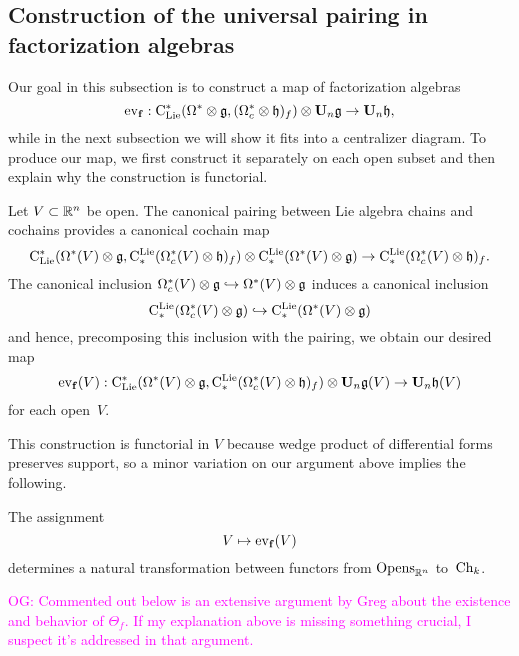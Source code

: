\documentclass[11pt]{amsart}
\numberwithin{equation}{section}
\def\owen{\textcolor{magenta}{OG: }\textcolor{magenta}}
\begin{document}
\subsection{Construction of the universal pairing in factorization algebras}
\label{SS:constuctionthetaf}

Our goal in this subsection is to construct a map of factorization algebras
\[
{\rm ev}_{\bf{f}}: {\rm C}_{\rm Lie}^*(\Omega^* \otimes \mathfrak g, (\Omega^*_c \otimes \mathfrak h)_f) \otimes \mathbf U_n \mathfrak g \to \mathbf U_n \mathfrak h,
\]
while in the next subsection we will show it fits into a centralizer diagram.
To produce our map, we first construct it separately on each open subset and then explain why the construction is functorial. 

Let $V \subset \mathbb R^n$ be open.
The canonical pairing between Lie algebra chains and cochains provides a canonical cochain map
\[
{\rm C}_{\rm Lie}^*(\Omega^*(V) \otimes \mathfrak g, {\rm C}^{\rm Lie}_*(\Omega^*_c(V) \otimes \mathfrak h)_f) \otimes {\rm C}^{\rm Lie}_*(\Omega^*(V) \otimes \mathfrak g) \to {\rm C}^{\rm Lie}_*(\Omega^*_c(V) \otimes \mathfrak h)_f.
\]
The canonical inclusion $\Omega^*_c(V) \otimes \mathfrak g \hookrightarrow \Omega^*(V) \otimes \mathfrak g$ induces a canonical inclusion 
\[
{\rm C}^{\rm Lie}_*(\Omega^*_c(V) \otimes \mathfrak g) \hookrightarrow {\rm C}^{\rm Lie}_*(\Omega^*(V) \otimes \mathfrak g)
\]
and hence, precomposing this inclusion with the pairing, we obtain our desired map
\[
{\rm ev}_{\bf{f}}(V): {\rm C}_{\rm Lie}^*(\Omega^*(V) \otimes \mathfrak g, {\rm C}^{\rm Lie}_*(\Omega^*_c(V) \otimes \mathfrak h)_f) \otimes \mathbf U_n \mathfrak g(V) \to \mathbf U_n \mathfrak h(V)
\]
for each open~$V$.

This construction is functorial in $V$ because wedge product of differential forms preserves support,
so a minor variation on our argument above implies the following.

\begin{lmm}
The assignment
\[
V \mapsto {\rm ev}_{\bf{f}}(V)
\]
determines a natural transformation between functors from ${\rm Opens}_{\mathbb R^n}$ to~${\rm Ch}_k$.
\end{lmm}

\owen{Commented out below is an extensive argument by Greg about the existence and behavior of $\Theta_f$. If my explanation above is missing something crucial, I suspect it's addressed in that argument.}
\end{document}
